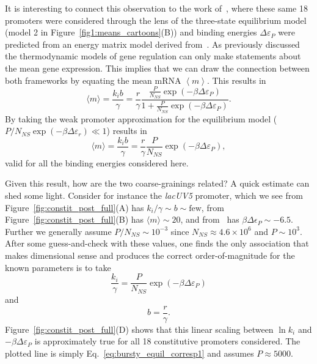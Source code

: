 It is interesting to connect this observation to the work
of~\cite{Brewster2012}, where these same 18 promoters were considered through
the lens of the three-state equilibrium model (model 2 in
Figure~\ref{fig1:means_cartoons}(B)) and binding energies $\Delta\varepsilon_P$
were predicted from an energy matrix model derived from~\cite{Kinney2010}. As
previously discussed the thermodynamic models of gene regulation can only make
statements about the mean gene expression. This implies that we can draw the
connection between both frameworks by equating the mean mRNA $\left\langle m
\right\rangle$. This results in
\begin{equation}
\langle m \rangle = \frac{k_i b}{\gamma}
        = \frac{r}{\gamma}
        \frac{\frac{P}{N_{NS}}\exp(-\beta\Delta\varepsilon_P)}
                {1+\frac{P}{N_{NS}}\exp(-\beta\Delta\varepsilon_P)}.
\end{equation}
By taking the weak promoter approximation for the equilibrium model ($P/N_{NS} 
\exp(-\beta\Delta\varepsilon_r) \ll 1$) results in
\begin{equation}
\langle m \rangle = \frac{k_i b}{\gamma}
        = \frac{r}{\gamma} \frac{P}{N_{NS}}\exp(-\beta\Delta\varepsilon_P),
\end{equation}
valid for all the binding energies considered here.

Given this result, how are the two coarse-grainings related? A quick estimate
can shed some light. Consider for instance the \textit{lacUV5} promoter, which
we see from Figure~\ref{fig:constit_post_full}(A) has $k_i/\gamma \sim b \sim
\text{few}$, from Figure~\ref{fig:constit_post_full}(B) has $\langle m \rangle
\sim 20$, and from~\cite{Brewster2012} has $\beta\Delta\epsilon_P \sim - 6.5$.
Further we generally assume $P/N_{NS} \sim 10^{-3}$ since
$N_{NS}\approx4.6\times10^6$ and $P\sim10^3$. After some guess-and-check with
these values, one finds the only association that makes dimensional sense and
produces the correct order-of-magnitude for the known parameters is to take
\begin{equation}
\frac{k_i}{\gamma} = \frac{P}{N_{NS}} \exp(-\beta\Delta\varepsilon_P)
\label{eq:bursty_equil_corresp1}
\end{equation}
and
\begin{equation}
b = \frac{r}{\gamma}.
\label{eq:bursty_equil_corresp2}
\end{equation}
Figure~\ref{fig:constit_post_full}(D) shows that this linear scaling between
$\ln k_i$ and $-\beta\Delta\varepsilon_P$ is approximately true for all 18
constitutive promoters considered. The plotted line is simply
Eq.~\ref{eq:bursty_equil_corresp1} and assumes $P\approx 5000$.

